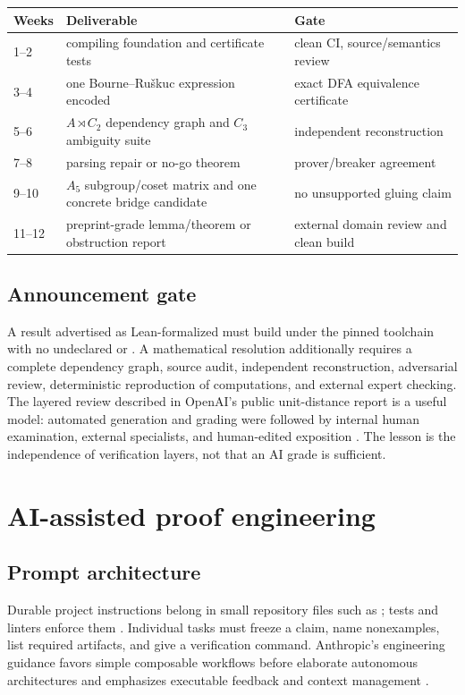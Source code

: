 \documentclass{amsart}
\begin{document}
\begin{center}
\begin{tabularx}{0.95\textwidth}{@{}lXl@{}}
\toprule
Weeks & Deliverable & Gate\\
\midrule
1--2 & compiling foundation and certificate tests & clean CI, source/semantics review\\
3--4 & one Bourne--Ru\v{s}kuc expression encoded & exact DFA equivalence certificate\\
5--6 & $A\rtimes C_2$ dependency graph and $C_3$ ambiguity suite & independent reconstruction\\
7--8 & parsing repair or no-go theorem & prover/breaker agreement\\
9--10 & $A_5$ subgroup/coset matrix and one concrete bridge candidate & no unsupported gluing claim\\
11--12 & preprint-grade lemma/theorem or obstruction report & external domain review and clean build\\
\bottomrule
\end{tabularx}
\end{center}

\subsection{Announcement gate}

A result advertised as Lean-formalized must build under the pinned toolchain with no undeclared  or .  A mathematical resolution additionally requires a complete dependency graph, source audit, independent reconstruction, adversarial review, deterministic reproduction of computations, and external expert checking.  The layered review described in OpenAI's public unit-distance report is a useful model: automated generation and grading were followed by internal human examination, external specialists, and human-edited exposition \cite{openaiUnitDistance2026}.  The lesson is the independence of verification layers, not that an AI grade is sufficient.

\section{AI-assisted proof engineering}

\subsection{Prompt architecture}

Durable project instructions belong in small repository files such as ; tests and linters enforce them \cite{openaiAgentsMD2026}.  Individual tasks must freeze a claim, name nonexamples, list required artifacts, and give a verification command.  Anthropic's engineering guidance favors simple composable workflows before elaborate autonomous architectures and emphasizes executable feedback and context management \cite{anthropicEffectiveAgents2024,anthropicClaudeBestPractices2026}.
\end{document}

